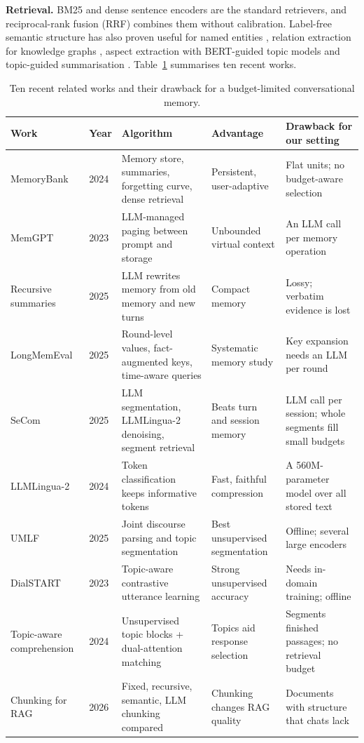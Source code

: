 \documentclass[conference]{IEEEtran}
\begin{document}
\textbf{Retrieval.} BM25 \cite{robertson2009bm25} and dense sentence encoders
\cite{reimers2019sbert,song2020mpnet} are the standard retrievers, and
reciprocal-rank fusion (RRF) \cite{cormack2009rrf} combines them without
calibration. Label-free semantic structure has also proven useful for named
entities \cite{veena2023agroner}, relation extraction for knowledge graphs
\cite{veena2023relation}, aspect extraction with BERT-guided topic models
\cite{venugopalan2022guidedlda} and topic-guided summarisation
\cite{gurusamy2023summarization}. Table~\ref{tab:lit} summarises ten recent
works.

\begin{table}[t]
\centering
\caption{Ten recent related works and their drawback for a budget-limited conversational memory.}
\label{tab:lit}
\footnotesize
\setlength{\tabcolsep}{4pt}
\renewcommand{\arraystretch}{1.08}
\begin{tabular}{@{}p{2.6cm}p{0.6cm}p{4.4cm}p{3.7cm}p{5.2cm}@{}}
\toprule
Work & Year & Algorithm & Advantage & Drawback for our setting \\
\midrule
MemoryBank \cite{zhong2024memorybank} & 2024 & Memory store, summaries, forgetting curve, dense retrieval & Persistent, user-adaptive & Flat units; no budget-aware selection \\
MemGPT \cite{packer2023memgpt} & 2023 & LLM-managed paging between prompt and storage & Unbounded virtual context & An LLM call per memory operation \\
Recursive summaries \cite{wang2025recursive} & 2025 & LLM rewrites memory from old memory and new turns & Compact memory & Lossy; verbatim evidence is lost \\
LongMemEval \cite{wu2025longmemeval} & 2025 & Round-level values, fact-augmented keys, time-aware queries & Systematic memory study & Key expansion needs an LLM per round \\
SeCom \cite{pan2025secom} & 2025 & LLM segmentation, LLMLingua-2 denoising, segment retrieval & Beats turn and session memory & LLM call per session; whole segments fill small budgets \\
LLMLingua-2 \cite{pan2024llmlingua2} & 2024 & Token classification keeps informative tokens & Fast, faithful compression & A 560M-parameter model over all stored text \\
UMLF \cite{xu2025umlf} & 2025 & Joint discourse parsing and topic segmentation & Best unsupervised segmentation & Offline; several large encoders \\
DialSTART \cite{gao2023dialstart} & 2023 & Topic-aware contrastive utterance learning & Strong unsupervised accuracy & Needs in-domain training; offline \\
Topic-aware comprehension \cite{ma2024topicaware} & 2024 & Unsupervised topic blocks + dual-attention matching & Topics aid response selection & Segments finished passages; no retrieval budget \\
Chunking for RAG \cite{lavarec2026chunking} & 2026 & Fixed, recursive, semantic, LLM chunking compared & Chunking changes RAG quality & Documents with structure that chats lack \\
\bottomrule
\end{tabular}
\end{table}
\end{document}
